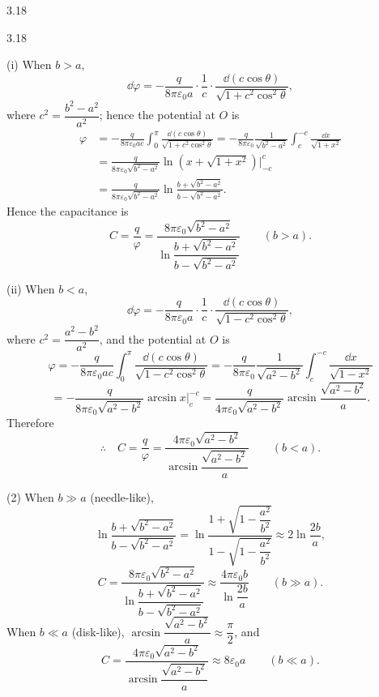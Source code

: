 \begin{solution}{3.18}
\begin{figbox}{3.18}
\end{figbox}

(i) When $b>a$,
\[
\dd\varphi=-\frac{q}{8\pi\varepsilon_0a}\cdot\frac{1}{c}\cdot
\frac{\dd(c\cos\theta)}{\sqrt{1+c^2\cos^2\theta}},
\]
where $c^2=\dfrac{b^2-a^2}{a^2}$; hence the potential at $O$ is
\begin{align*}
\varphi&=-\frac{q}{8\pi\varepsilon_0ac}\int_0^\pi
\frac{\dd(c\cos\theta)}{\sqrt{1+c^2\cos^2\theta}}
=-\frac{q}{8\pi\varepsilon_0}\frac{1}{\sqrt{b^2-a^2}}
\int_c^{-c}\frac{\dd x}{\sqrt{1+x^2}}\\
&=\frac{q}{8\pi\varepsilon_0\sqrt{b^2-a^2}}
\ln\left(x+\sqrt{1+x^2}\right)\Big|_{-c}^{c}\\
&=\frac{q}{8\pi\varepsilon_0\sqrt{b^2-a^2}}
\ln\frac{b+\sqrt{b^2-a^2}}{b-\sqrt{b^2-a^2}}.
\end{align*}
Hence the capacitance is
\[
C=\frac{q}{\varphi}
=\frac{8\pi\varepsilon_0\sqrt{b^2-a^2}}
{\ln\dfrac{b+\sqrt{b^2-a^2}}{b-\sqrt{b^2-a^2}}}
\qquad(b>a).
\]

(ii) When $b<a$,
\[
\dd\varphi=-\frac{q}{8\pi\varepsilon_0a}\cdot\frac{1}{c}\cdot
\frac{\dd(c\cos\theta)}{\sqrt{1-c^2\cos^2\theta}},
\]
where $c^2=\dfrac{a^2-b^2}{a^2}$, and the potential at $O$ is
\[
\varphi=-\frac{q}{8\pi\varepsilon_0ac}\int_0^\pi
\frac{\dd(c\cos\theta)}{\sqrt{1-c^2\cos^2\theta}}
=-\frac{q}{8\pi\varepsilon_0}\frac{1}{\sqrt{a^2-b^2}}
\int_c^{-c}\frac{\dd x}{\sqrt{1-x^2}}
\]
\[
=-\frac{q}{8\pi\varepsilon_0\sqrt{a^2-b^2}}\arcsin x\Big|_c^{-c}
=\frac{q}{4\pi\varepsilon_0\sqrt{a^2-b^2}}\arcsin\frac{\sqrt{a^2-b^2}}{a}.
\]
Therefore
\[
\therefore\quad C=\frac{q}{\varphi}
=\frac{4\pi\varepsilon_0\sqrt{a^2-b^2}}{\arcsin\dfrac{\sqrt{a^2-b^2}}{a}}
\qquad(b<a).
\]

(2) When $b\gg a$ (needle-like),
\[
\ln\frac{b+\sqrt{b^2-a^2}}{b-\sqrt{b^2-a^2}}
=\ln\frac{1+\sqrt{1-\dfrac{a^2}{b^2}}}{1-\sqrt{1-\dfrac{a^2}{b^2}}}
\approx2\ln\frac{2b}{a},
\]
\[
C=\frac{8\pi\varepsilon_0\sqrt{b^2-a^2}}
{\ln\dfrac{b+\sqrt{b^2-a^2}}{b-\sqrt{b^2-a^2}}}
\approx\frac{4\pi\varepsilon_0b}{\ln\dfrac{2b}{a}}
\qquad(b\gg a).
\]
When $b\ll a$ (disk-like), $\arcsin\dfrac{\sqrt{a^2-b^2}}{a}\approx\dfrac{\pi}{2}$, and
\[
C=\frac{4\pi\varepsilon_0\sqrt{a^2-b^2}}{\arcsin\dfrac{\sqrt{a^2-b^2}}{a}}
\approx8\varepsilon_0a
\qquad(b\ll a).
\]


\end{solution}
